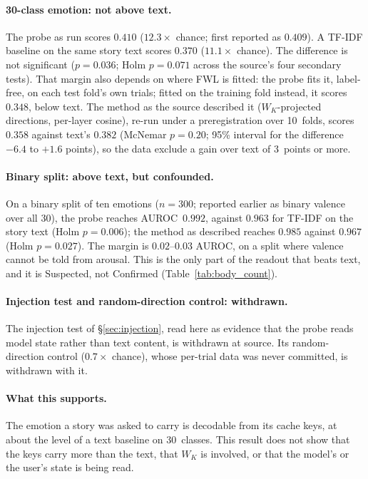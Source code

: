 \documentclass[11pt,a4paper]{article}
\begin{document}
\paragraph{30-class emotion: not above text.} The probe as run scores
$0.410$ ($12.3\times$ chance; first reported as $0.409$). A TF-IDF baseline
on the same story text scores $0.370$ ($11.1\times$ chance). The difference
is not significant ($p = 0.036$; Holm $p = 0.071$ across the source's four
secondary tests). That margin also depends on where FWL is fitted: the probe
fits it, label-free, on each test fold's own trials; fitted on the training
fold instead, it scores $0.348$, below text. The method as the source
described it ($W_K$-projected directions, per-layer cosine), re-run under a
preregistration over 10~folds, scores $0.358$ against text's $0.382$
(McNemar $p = 0.20$; 95\% interval for the difference $-6.4$ to $+1.6$
points), so the data exclude a gain over text of 3~points or more.

\paragraph{Binary split: above text, but confounded.} On a binary split of
ten emotions ($n = 300$; reported earlier as binary valence over all 30),
the probe reaches AUROC~$0.992$, against $0.963$ for TF-IDF on the story
text (Holm $p = 0.006$); the method as described reaches $0.985$ against
$0.967$ (Holm $p = 0.027$). The margin is $0.02$--$0.03$ AUROC, on a split
where valence cannot be told from arousal. This is the only part of the
readout that beats text, and it is Suspected, not Confirmed
(Table~\ref{tab:body_count}).

\paragraph{Injection test and random-direction control: withdrawn.} The
injection test of \S\ref{sec:injection}, read here as evidence that the
probe reads model state rather than text content, is withdrawn at source.
Its random-direction control ($0.7\times$ chance), whose per-trial data was
never committed, is withdrawn with it.

\paragraph{What this supports.} The emotion a story was asked to carry is
decodable from its cache keys, at about the level of a text baseline on
30~classes. This result does not show that the keys carry more than the
text, that $W_K$ is involved, or that the model's or the user's state is
being read.
\end{document}
